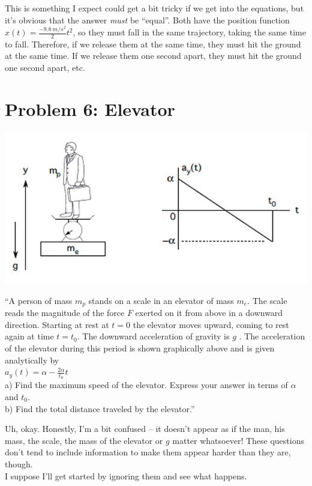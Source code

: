 \documentclass[12pt,a4paper]{report}
\begin{document}
This is something I expect could get a bit tricky if we get into the equations, but it's obvious that the answer \emph{must} be ``equal''. Both have the position function $\displaystyle x(t) = \frac{\SI{-9.8}{m/s^2}}{2} t^2$, so they must fall in the same trajectory, taking the same time to fall. Therefore, if we release them at the same time, they must hit the ground at the same time. If we release them one second apart, they must hit the ground one second apart, etc.

\section{Problem 6: Elevator}

\begin{center}
\includegraphics[scale=0.8]{Graphics/h1p6}
\end{center}

``A person of mass $m_p$ stands on a scale in an elevator of mass $m_e$. The scale reads the magnitude of the force $F$ exerted on it from above in a downward direction. Starting at rest at $t = 0$ the elevator moves upward, coming to rest again at time $t = t_0$. The downward acceleration of gravity is $g$ . The acceleration of the elevator during this period is shown graphically above and is given analytically by\\
$\displaystyle a_y(t) = \alpha - \frac{2\alpha}{t_0} t$\\
a) Find the maximum speed of the elevator. Express your answer in terms of $\alpha$ and $t_0$.\\
b) Find the total distance traveled by the elevator.''

Uh, okay. Honestly, I'm a bit confused -- it doesn't appear as if the man, his mass, the scale, the mass of the elevator or $g$ matter whatsoever! These questions don't tend to include information to make them appear harder than they are, though.\\
I suppose I'll get started by ignoring them and see what happens.
\end{document}
